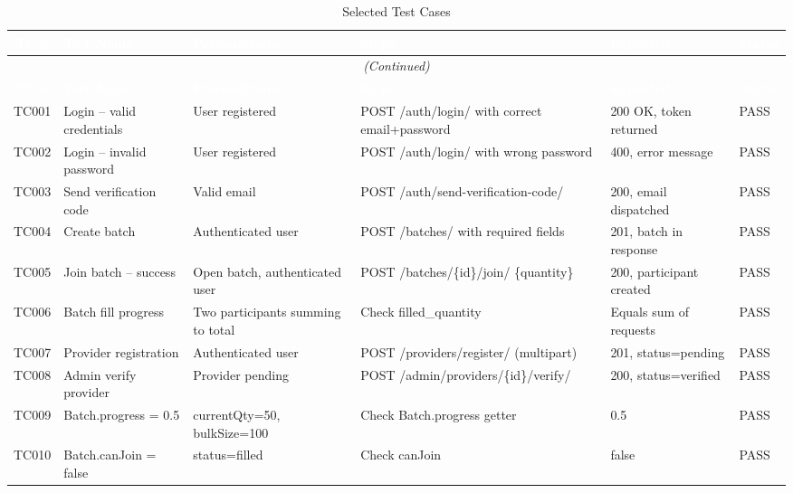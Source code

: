 \documentclass[12pt, a4paper]{report}
\begin{document}
\begin{longtable}{c p{3cm} p{3cm} p{3cm} p{3cm} p{1cm}}
\caption{Selected Test Cases}\label{tab:testcases}\\
\toprule
\rowcolor{tablehead}
\textcolor{white}{\textbf{TC\#}} &
\textcolor{white}{\textbf{Test Name}} &
\textcolor{white}{\textbf{Preconditions}} &
\textcolor{white}{\textbf{Steps}} &
\textcolor{white}{\textbf{Expected}} &
\textcolor{white}{\textbf{Status}}\\
\midrule
\endfirsthead
\multicolumn{6}{c}{\small\itshape (Continued)}\\
\toprule
\rowcolor{tablehead}
\textcolor{white}{\textbf{TC\#}} &
\textcolor{white}{\textbf{Test Name}} &
\textcolor{white}{\textbf{Preconditions}} &
\textcolor{white}{\textbf{Steps}} &
\textcolor{white}{\textbf{Expected}} &
\textcolor{white}{\textbf{Status}}\\
\midrule
\endhead
\bottomrule
\endfoot
TC001 & Login -- valid credentials & User registered & POST /auth/login/ with correct email+password & 200 OK, token returned & PASS\\
\rowcolor{batchitLight}
TC002 & Login -- invalid password & User registered & POST /auth/login/ with wrong password & 400, error message & PASS\\
TC003 & Send verification code & Valid email & POST /auth/send-verification-code/ & 200, email dispatched & PASS\\
\rowcolor{batchitLight}
TC004 & Create batch & Authenticated user & POST /batches/ with required fields & 201, batch in response & PASS\\
TC005 & Join batch -- success & Open batch, authenticated user & POST /batches/\{id\}/join/ \{quantity\} & 200, participant created & PASS\\
\rowcolor{batchitLight}
TC006 & Batch fill progress & Two participants summing to total & Check filled\_quantity & Equals sum of requests & PASS\\
TC007 & Provider registration & Authenticated user & POST /providers/register/ (multipart) & 201, status=pending & PASS\\
\rowcolor{batchitLight}
TC008 & Admin verify provider & Provider pending & POST /admin/providers/\{id\}/verify/ & 200, status=verified & PASS\\
TC009 & Batch.progress = 0.5 & currentQty=50, bulkSize=100 & Check Batch.progress getter & 0.5 & PASS\\
\rowcolor{batchitLight}
TC010 & Batch.canJoin = false & status=filled & Check canJoin & false & PASS\\

\end{longtable}
\end{document}

